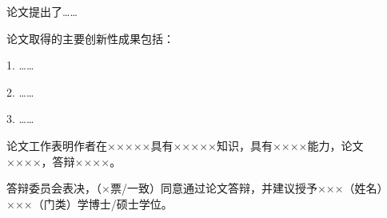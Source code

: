 
\begin{resolution}

  论文提出了……

  论文取得的主要创新性成果包括：

  1. ……

  2. ……

  3. ……

  论文工作表明作者在×××××具有×××××知识，具有××××能力，论文××××，答辩××××。

  答辩委员会表决，（×票/一致）同意通过论文答辩，并建议授予×××（姓名）×××（门类）学博士/硕士学位。

\end{resolution}
